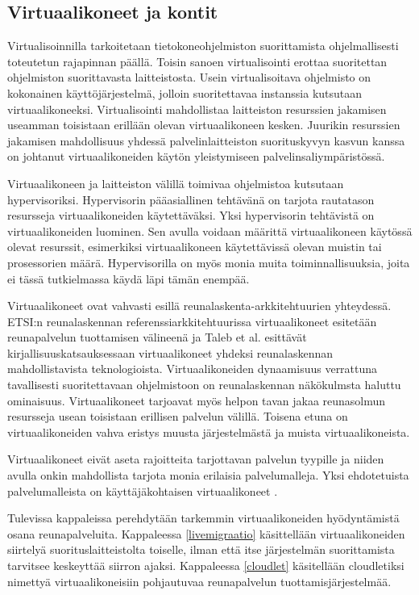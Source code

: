 \subsection{Virtuaalikoneet ja kontit}

Virtualisoinnilla tarkoitetaan tietokoneohjelmiston suorittamista ohjelmallisesti toteutetun rajapinnan päällä. 
Toisin sanoen virtualisointi erottaa suoritettan ohjelmiston suorittavasta laitteistosta.
Usein virtualisoitava ohjelmisto on kokonainen käyttöjärjestelmä, jolloin suoritettavaa instanssia kutsutaan virtuaalikoneeksi. 
Virtualisointi mahdollistaa laitteiston resurssien jakamisen useamman toisistaan erillään olevan virtuaalikoneen kesken.
Juurikin resurssien jakamisen mahdollisuus yhdessä palvelinlaitteiston suorituskyvyn kasvun kanssa on johtanut virtuaalikoneiden käytön yleistymiseen palvelinsaliympäristössä.

Virtuaalikoneen ja laitteiston välillä toimivaa ohjelmistoa kutsutaan hypervisoriksi. Hypervisorin pääasiallinen tehtävänä on tarjota rautatason resursseja virtuaalikoneiden käytettäväksi. 
Yksi hypervisorin tehtävistä on virtuaalikoneiden luominen. Sen avulla voidaan määrittä virtuaalikoneen käytössä olevat resurssit, esimerkiksi virtuaalikoneen käytettävissä olevan muistin tai prosessorien määrä. Hypervisorilla on myös monia muita toiminnallisuuksia, joita ei tässä tutkielmassa käydä läpi tämän enempää. 

Virtuaalikoneet ovat vahvasti esillä reunalaskenta-arkkitehtuurien yhteydessä. 
ETSI:n reunalaskennan referenssiarkkitehtuurissa \cite{etsirefarch} virtuaalikoneet esitetään reunapalvelun tuottamisen välineenä ja Taleb et al. \cite{taleb2017multi} esittävät kirjallisuuskatsauksessaan virtuaalikoneet yhdeksi reunalaskennan mahdollistavista teknologioista.
Virtuaalikoneiden dynaamisuus verrattuna tavallisesti suoritettavaan ohjelmistoon on reunalaskennan näkökulmsta haluttu ominaisuus. 
Virtuaalikoneet tarjoavat myös helpon tavan jakaa reunasolmun resursseja usean toisistaan erillisen palvelun välillä.
Toisena etuna on virtuaalikoneiden vahva eristys muusta järjestelmästä ja muista virtuaalikoneista.

Virtuaalikoneet eivät aseta rajoitteita tarjottavan palvelun tyypille ja niiden avulla onkin mahdollista tarjota monia erilaisia palvelumalleja.
Yksi ehdotetuista palvelumalleista on käyttäjäkohtaisen virtuaalikoneet \cite{satya09,wang2015mobiscud}. 

Tulevissa kappaleissa perehdytään tarkemmin virtuaalikoneiden hyödyntämistä osana reunapalveluita.
Kappaleessa \ref{livemigraatio} käsittellään virtuaalikoneiden siirtelyä suorituslaitteistolta toiselle, ilman että itse järjestelmän suorittamista tarvitsee keskeyttää siirron ajaksi. 
Kappaleessa \ref{cloudlet} käsitellään cloudletiksi nimettyä  virtuaalikoneisiin pohjautuvaa reunapalvelun tuottamisjärjestelmää.




